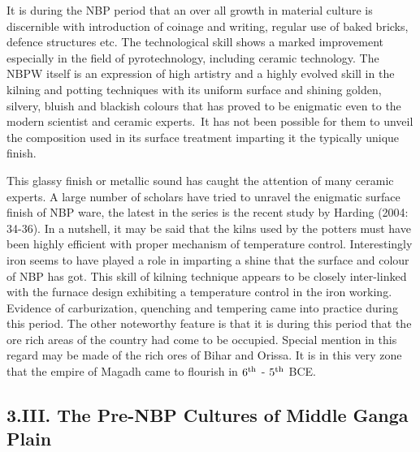 It is during the NBP period that an over all growth in material culture is discernible with introduction of coinage and writing, regular use of baked bricks, defence structures etc. The technological skill shows a marked improvement especially in the field of pyrotechnology, including ceramic technology. The NBPW itself is an expression of high artistry and a highly evolved skill in the kilning and potting techniques with its uniform surface and shining golden, silvery, bluish and blackish colours that has proved to be enigmatic even to the modern scientist and ceramic experts.~It has not been possible for them to unveil the composition used in its surface treatment imparting it the typically unique finish.

This glassy finish or metallic sound has caught the attention of many ceramic experts. A large number of scholars have tried to unravel the enigmatic surface finish of NBP ware, the latest in the series is the recent study by Harding (2004: 34-36). In a nutshell, it may be said that the kilns used by the potters must have been highly efficient with proper mechanism of temperature control. Interestingly iron seems to have played a role in imparting a shine that the surface and colour of NBP has got.  This skill of kilning technique appears to be closely inter-linked with the furnace design exhibiting a temperature control in the iron working. Evidence of carburization, quenching and tempering came into practice during this period. The other noteworthy feature is that it is during this period that the ore rich areas of the country had come to be occupied. Special mention in this regard may be made of the rich ores of Bihar and Orissa. It is in this very zone that the empire of Magadh came to flourish in $6^{\rm th}$ - $5^{\rm th}$ BCE.

\vspace{-.3cm}

\subsection*{3.III. The Pre-NBP Cultures of Middle Ganga Plain}\label{subsection-10}

